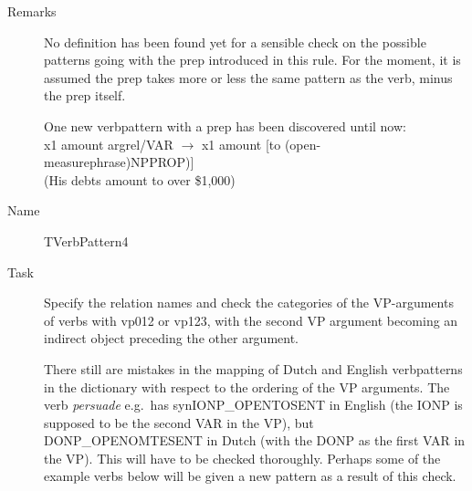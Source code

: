 \begin{description}
\begin{description}
\item[Remarks] No definition has been found yet for a sensible check on the 
possible patterns going with the prep introduced in this rule. For the moment,
it is assumed the prep takes more or less the same pattern as the verb, minus 
the prep itself.

One new verbpattern with a prep has been discovered until now:\\
x1 amount argrel/VAR $\rightarrow$ x1 amount [to (open-measurephrase)NPPROP)] \\
(His debts amount to over \$1,000)
\end{description}

\vspace{1 cm}
\begin{description}
\item[Name] TVerbPattern4
\item[Task] Specify the relation names and check the categories of the VP-arguments
of verbs with vp012 or vp123, with the second VP argument becoming an indirect
object preceding the other argument.

There still are mistakes in the mapping of Dutch and English verbpatterns in 
the dictionary with respect to the ordering of the VP arguments. The verb 
{\em persuade\/} e.g.\ has synIONP\_OPENTOSENT in English (the IONP is supposed 
to be the second VAR in the VP), but DONP\_OPENOMTESENT in Dutch (with the DONP 
as the first VAR in the VP). This will have to be checked thoroughly. Perhaps 
some of the example verbs below will be given a new pattern as a result of this 
check.


\end{description}
\end{description}
